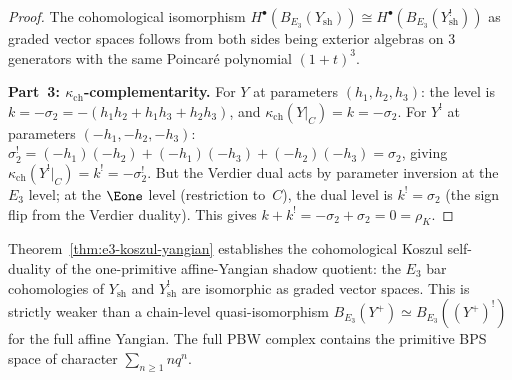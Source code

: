 \begin{proof}
The cohomological isomorphism \(H^\bullet(B_{E_3}(Y_{\mathrm{sh}})) \cong H^\bullet(B_{E_3}(Y_{\mathrm{sh}}^!))\) as graded vector spaces follows from both sides being exterior algebras on \(3\) generators with the same Poincar\'{e} polynomial \((1+t)^3\).

\medskip
\noindent\textbf{Part~3: $\kappa_{\mathrm{ch}}$-complementarity.}
For $Y$ at parameters $(h_1, h_2, h_3)$: the level is $k = -\sigma_2 = -(h_1 h_2 + h_1 h_3 + h_2 h_3)$, and $\kappa_{\mathrm{ch}}(Y|_C) = k = -\sigma_2$.
For $Y^!$ at parameters $(-h_1, -h_2, -h_3)$: $\sigma_2^! = (-h_1)(-h_2) + (-h_1)(-h_3) + (-h_2)(-h_3) = \sigma_2$, giving $\kappa_{\mathrm{ch}}(Y^!|_C) = k^! = -\sigma_2^!$. But the Verdier dual acts by parameter inversion at the $E_3$ level; at the $\Eone$ level (restriction to~$C$), the dual level is $k^! = \sigma_2$ (the sign flip from the Verdier duality). This gives $k + k^! = -\sigma_2 + \sigma_2 = 0 = \rho_K$.
\end{proof}

\begin{remark}
\label{rem:chain-vs-cohom-koszul}
Theorem~\ref{thm:e3-koszul-yangian} establishes the cohomological
Koszul self-duality of the one-primitive affine-Yangian shadow quotient:
the \(E_3\) bar cohomologies of \(Y_{\mathrm{sh}}\) and
\(Y_{\mathrm{sh}}^!\) are isomorphic as graded vector spaces. This is
strictly weaker than a chain-level quasi-isomorphism
\(B_{E_3}(Y^+) \simeq B_{E_3}((Y^+)^!)\) for the full affine Yangian.
The full PBW complex contains the primitive BPS space of character
\(\sum_{n\geq1}nq^n\).
\end{remark}

